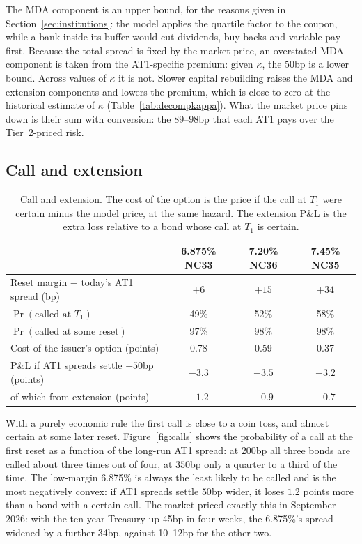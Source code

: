 The MDA component is an upper bound, for the reasons given in Section~\ref{sec:institutions}:
the model applies the quartile factor to the coupon, while a bank inside its buffer would
cut dividends, buy-backs and variable pay first. Because the total spread is fixed by the
market price, an overstated MDA component is taken from the AT1-specific premium: given
$\kappa$, the $50$bp is a lower bound. Across values of $\kappa$ it is not. Slower capital
rebuilding raises the MDA and extension components and lowers the premium, which is close
to zero at the historical estimate of $\kappa$ (Table~\ref{tab:decompkappa}). What the
market price pins down is their sum with conversion: the $89$--$98$bp that each AT1 pays
over the Tier~2-priced risk.

\subsection{Call and extension}

\begin{table}[H]
\centering
\begin{tabular}{lccc}
\toprule
 & 6.875\% NC33 & 7.20\% NC36 & 7.45\% NC35 \\
\midrule
Reset margin $-$ today's AT1 spread (bp) & $+6$ & $+15$ & $+34$ \\
$\Pr(\text{called at }T_1)$ & 49\% & 52\% & 58\% \\
$\Pr(\text{called at some reset})$ & 97\% & 98\% & 98\% \\
Cost of the issuer's option (points) & 0.78 & 0.59 & 0.37 \\
P\&L if AT1 spreads settle $+50$bp (points) & $-3.3$ & $-3.5$ & $-3.2$ \\
\quad of which from extension (points) & $-1.2$ & $-0.9$ & $-0.7$ \\
\bottomrule
\end{tabular}
\caption{Call and extension. The cost of the option is the price if the call at $T_1$ were
certain minus the model price, at the same hazard. The extension P\&L is the extra loss
relative to a bond whose call at $T_1$ is certain.}
\label{tab:callext}
\end{table}

With a purely economic rule the first call is close to a coin toss, and almost certain at
some later reset. Figure~\ref{fig:calls} shows the probability of a call at the first reset
as a function of the long-run AT1 spread: at $200$bp all three bonds are called about three
times out of four, at $350$bp only a quarter to a third of the time. The low-margin 6.875\%
is always the least likely to be called and is the most negatively convex: if AT1 spreads
settle $50$bp wider, it loses $1.2$ points more than a bond with a certain call. The market
priced exactly this in September 2026: with the ten-year Treasury up 45bp in four weeks,
the 6.875\%'s spread widened by a further 34bp, against 10--12bp for the other two.

